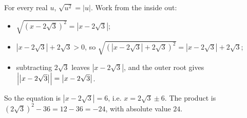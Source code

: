 For every real $u$, $\sqrt{u^2}=|u|$. Work from the inside out:
\begin{itemize}
\item $\sqrt{\left(x-2\sqrt3\right)^2}=\left|x-2\sqrt3\right|$;
\item $\left|x-2\sqrt3\right|+2\sqrt3>0$, so $\sqrt{\left(\left|x-2\sqrt3\right|+2\sqrt3\right)^2}=\left|x-2\sqrt3\right|+2\sqrt3$;
\item subtracting $2\sqrt3$ leaves $\left|x-2\sqrt3\right|$, and the outer root gives $\Bigl|\left|x-2\sqrt3\right|\Bigr|=\left|x-2\sqrt3\right|$.
\end{itemize}
So the equation is $\left|x-2\sqrt3\right|=6$, i.e. $x=2\sqrt3\pm6$. The product is $\left(2\sqrt3\right)^2-36=12-36=-24$, with absolute value $\boxed{24}$.

